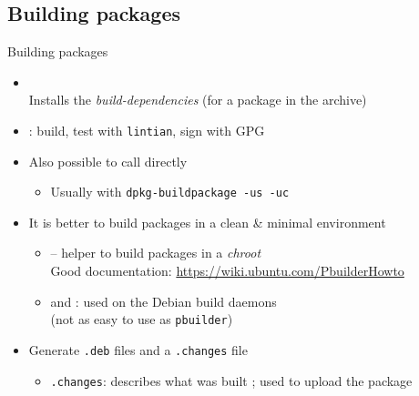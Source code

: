 \documentclass[10pt,final]{beamer}
\begin{document}
\subsection{Building packages}
\begin{frame}{Building packages}
  \begin{itemize}
  \item {}\\
    Installs the \textsl{build-dependencies} (for a package in the archive)
    
    \br
  \item {}: build, test with \texttt{lintian}, sign with GPG
    \br
  \item Also possible to call  directly
    \begin{itemize}
    \item Usually with \texttt{dpkg-buildpackage -us -uc}
    \end{itemize}
    \br
  \item It is better to build packages in a clean \& minimal environment
    \begin{itemize}
    \item {} -- helper to build packages in a \textsl{chroot}\\
      Good documentation: \url{https://wiki.ubuntu.com/PbuilderHowto}
      \hbr
    \item {} and : used on the Debian build daemons\\
      (not as easy to use as \texttt{pbuilder})
    \end{itemize}
    \br
  \item Generate \texttt{.deb} files and a \texttt{.changes} file
    \begin{itemize}
    \item \texttt{.changes}: describes what was built ; used to upload the package
    \end{itemize}
  \end{itemize}
\end{frame}
\end{document}
